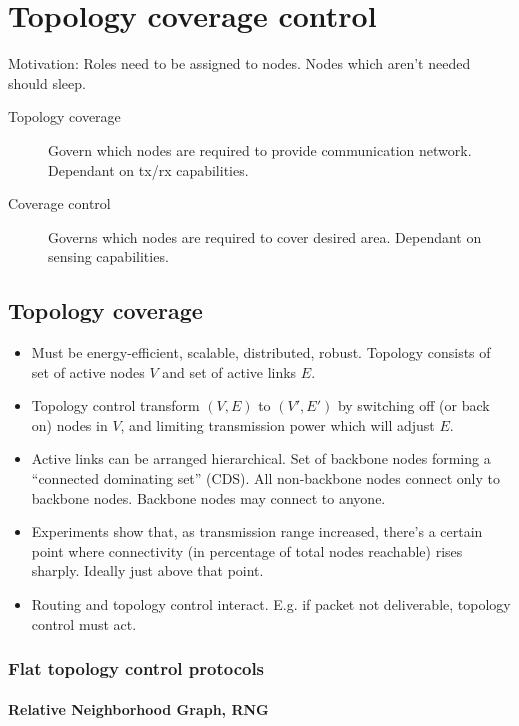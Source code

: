 \section{Topology coverage control}

Motivation: Roles need to be assigned to nodes. Nodes which aren't needed
should sleep.

\begin{description}
		\item[Topology coverage] Govern which nodes are required to provide
				communication network. Dependant on tx/rx capabilities.
		\item[Coverage control] Governs which nodes are required to cover
				desired area. Dependant on sensing capabilities.
\end{description}


\subsection{Topology coverage}

\begin{itemize}
		\item Must be energy-efficient, scalable, distributed, robust. Topology
				consists of set of active nodes $V$ and set of active links
				$E$.
		\item Topology control transform $(V, E)$ to $(V', E')$ by switching
				off (or back on) nodes in $V$, and limiting transmission power
				which will adjust $E$.
		\item Active links can be arranged hierarchical. Set of backbone nodes
				forming a ``connected dominating set'' (CDS). All non-backbone
				nodes connect only to backbone nodes. Backbone nodes may
				connect to anyone.
		\item Experiments show that, as transmission range increased, there's a
				certain point where connectivity (in percentage of total nodes
				reachable) rises sharply.  Ideally just above that point.
		\item Routing and topology control interact. E.g. if packet not
				deliverable, topology control must act.
\end{itemize}

\subsubsection{Flat topology control protocols}

\paragraph{Relative Neighborhood Graph, RNG}

